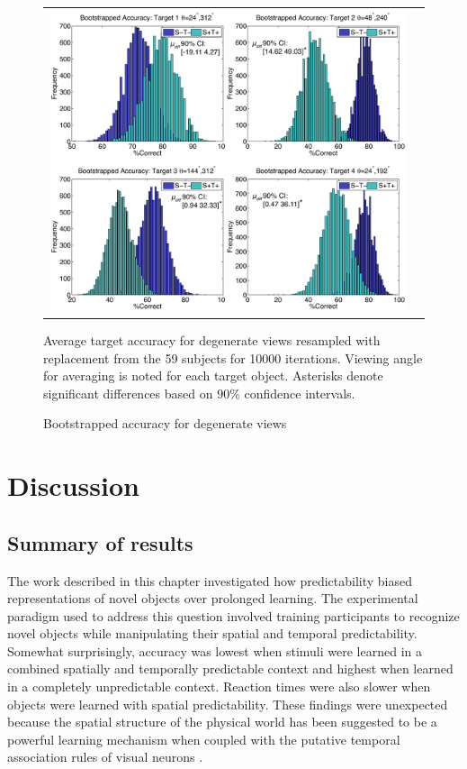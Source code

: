 \documentclass[dwyatte_dissertation.tex]{subfiles}
\begin{document}
\begin{figure}[h!]
\begin{center}
\begin{tabular}{ll}
\includegraphics[width=160mm]{figs/chap_bpleast/results_bootstrap_montage.pdf}
\end{tabular}
\end{center}
\caption{Bootstrapped accuracy for degenerate views}{Average target accuracy for degenerate views resampled with replacement from the 59 subjects for 10000 iterations. Viewing angle for averaging is noted for each target object. Asterisks denote significant differences based on 90\% confidence intervals.}
\label{fig:bpleast_behave_bootstrap}
\end{figure}

\section{Discussion}\subsection{Summary of results}
The work described in this chapter investigated how predictability biased representations of novel objects over prolonged learning. The experimental paradigm used to address this question involved training participants to recognize novel objects while manipulating their spatial and temporal predictability. Somewhat surprisingly, accuracy was lowest when stimuli were learned in a combined spatially and temporally predictable context and highest when learned in a completely unpredictable context. Reaction times were also slower when objects were learned with spatial predictability. These findings were unexpected because the spatial structure of the physical world has been suggested to be a powerful learning mechanism when coupled with the putative temporal association rules of visual neurons \cite{StringerPerryRollsEtAl06,WallisBaddeley97,IsikLeiboPoggio12,SakaiMiyashita91,MeyerOlson11,CoxMeierOerteltEtAl05,LiDiCarlo08,LiDiCarlo10,LiDiCarlo12}.
\end{document}
